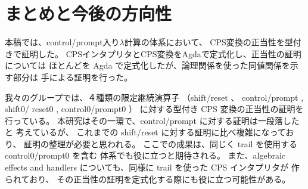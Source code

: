 \section{まとめと今後の方向性}
本稿では、control/prompt入り$\lambda$計算の体系において、
CPS変換の正当性を型付きで証明した。
CPSインタプリタとCPS変換をAgdaで定式化し、正当性の証明については
ほとんどを Agda で定式化したが、論理関係を使った同値関係を示す部分は
手による証明を行った。

我々のグループでは、４種類の限定継続演算子
（shift/reset \cite{DF1990,DF1992}、
control/prompt \cite{POPL88},
shift0/ reset0 \cite{materzok-subtyping},
control0/prompt0 \cite{gunter-cupto}）
に対する型付き CPS 変換の正当性の証明を行っている。
本研究はその一環で、control/prompt に対する証明は一段落したと
考えているが、
これまでの shift/reset に対する証明に比べ複雑になっており、
証明の整理が必要と思われる。
ここでの成果は、同じく trail を使用する control0/prompt0 を含む
体系でも役に立つと期待される。
また、algebraic effects and handlers \cite{bauer-tutorial}
についても、同様に trail を使った CPS インタプリタが
作られており、
その正当性の証明を定式化する際にも役に立つ可能性がある。
